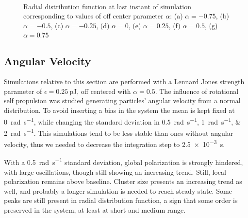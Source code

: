 \documentclass[../../master_thesis_np.tex]{subfiles}
\begin{document}
\begin{figure}[htp]
			\\
			
			\caption{Radial distribution function at last instant of simulation corresponding to values of off center parameter $\alpha$: (a) $\alpha = -0.75$, (b) $\alpha = -0.5$, (c) $\alpha = -0.25$, (d) $\alpha = 0$, (e) $\alpha = 0.25$, (f) $\alpha = 0.5$, (g) $\alpha = 0.75$}
			\label{fig:lj_oc_rdf}
		\end{figure}

	
		
		\subsection{Angular Velocity}
		Simulations relative to this section are performed with a Lennard Jones strength parameter of $\epsilon = \SI{0.25}{\pico\joule}$, off centered with $\alpha = 0.5$.
		The influence of rotational self propulsion was studied generating particles' angular velocity from a normal distribution.
		To avoid inserting a bias in the system the mean is kept fixed at \SI{0}{\radian\per\second}, while changing the standard deviation in \qtylist{0.5; 1;2}{\radian\per\second}.
		This simulations tend to be less stable than ones without angular velocity, thus we needed to decrease the integration step to \SI{2.5 e-3}{\second}.
		
		With a \SI{0.5}{\radian\per\second} standard deviation, global polarization is strongly hindered, with large oscillations, though still showing an increasing trend.
		Still, local polarization remains above baseline.
		Cluster size presents an increasing trend as well, and probably a longer simulation is needed to reach steady state.
		Some peaks are still present in radial distribution function, a sign that some order is preserved in the system, at least at short and medium range.
		
\end{document}
